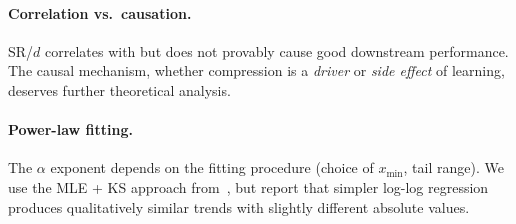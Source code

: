 \paragraph{Correlation vs.\ causation.} SR/$d$ correlates with but does not provably cause good downstream performance. The causal mechanism, whether compression is a \emph{driver} or \emph{side effect} of learning, deserves further theoretical analysis.

\paragraph{Power-law fitting.} The $\alpha$ exponent depends on the fitting procedure (choice of $x_{\min}$, tail range). We use the MLE + KS approach from~\citet{martin_mahoney_jmlr2021}, but report that simpler log-log regression produces qualitatively similar trends with slightly different absolute values.
